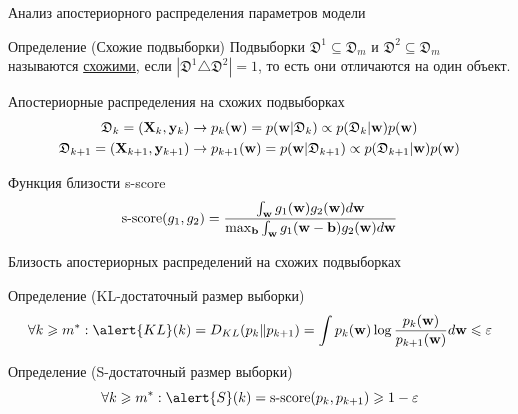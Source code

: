 \documentclass{beamer}
\begin{document}
\begin{frame}{Анализ апостериорного распределения параметров модели}
    \vspace{-0.2cm}
    \begin{block}{Определение (Схожие подвыборки)}
        Подвыборки $\mathfrak{D}^1 \subseteq \mathfrak{D}_m$ и $\mathfrak{D}^2 \subseteq \mathfrak{D}_m$ называются \underline{схожими}, если $\left| \mathfrak{D}^1 \triangle \mathfrak{D}^2 \right| = 1$, то есть они отличаются на один объект.
        \vspace{-0.3cm}
    \end{block}
    \begin{block}{Апостериорные распределения на схожих подвыборках}
        \vspace{-0.7cm}
        \begin{align*}
            \mathfrak{D}_k = (\mathbf{X}_k, \mathbf{y}_k) &\to p_k(\mathbf{w}) = p(\mathbf{w} | \mathfrak{D}_k) \propto p(\mathfrak{D}_k | \mathbf{w}) p(\mathbf{w}) \\
            \mathfrak{D}_{k+1} = (\mathbf{X}_{k+1}, \mathbf{y}_{k+1}) &\to p_{k+1}(\mathbf{w}) = p(\mathbf{w} | \mathfrak{D}_{k+1}) \propto p(\mathfrak{D}_{k+1} | \mathbf{w}) p(\mathbf{w})
        \end{align*}
        \vspace{-1cm}
    \end{block}
    \begin{block}{Функция близости s-score}
        \vspace{-0.3cm}
        \[ \mathrm{s\text{-}score}(g_1, g_2) = \dfrac{\int_{\mathbf{w}} g_1(\mathbf{w}) g_2(\mathbf{w}) d\mathbf{w}}{\max_{\mathbf{b}} \int_{\mathbf{w}} g_1(\mathbf{w} - \mathbf{b}) g_2(\mathbf{w}) d\mathbf{w}} \]
    \end{block}
\end{frame}

\begin{frame}{Близость апостериорных распределений на схожих подвыборках}
    \begin{figure}
        
    \end{figure}
    \begin{block}{Определение (\alert{KL}-достаточный размер выборки)}
        \vspace{-0.4cm}
        \[ \forall k \geqslant m^*: \alert{KL}(k) = D_{KL}(p_k \| p_{k+1}) = \int p_k(\bw) \log{\dfrac{p_k(\bw)}{p_{k+1}(\bw)}} d\bw \leqslant \varepsilon \]
    \end{block} 
    \begin{block}{Определение (\alert{S}-достаточный размер выборки)}
        \vspace{-0.1cm}
        \[ \forall k \geqslant m^*: \alert{S}(k) = \mathrm{s\text{-}score}(p_k, p_{k+1}) \geqslant 1-\varepsilon \]
    \end{block} 
\end{frame}
\end{document}
